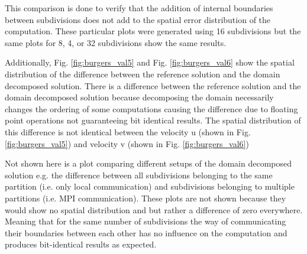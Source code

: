 This comparison is done to verify that the addition of internal boundaries between subdivisions does not add to the spatial error distribution of the computation.
These particular plots were generated using 16 subdivisions but the same plots for 8, 4, or 32 subdivisions show the same results.

Additionally, Fig. \ref{fig:burgers_val5} and Fig. \ref{fig:burgers_val6} show the spatial distribution of the difference between the reference solution and the domain decomposed solution.
There is a difference between the reference solution and the domain decomposed solution because decomposing the domain necessarily changes the ordering of some computations causing the difference due to floating point operations not guaranteeing bit identical results.
The spatial distribution of this difference is not identical between the velocity u (shown in Fig. \ref{fig:burgers_val5}) and velocity v (shown in Fig. \ref{fig:burgers_val6})

Not shown here is a plot comparing different setups of the domain decomposed solution e.g. the difference between all subdivisions belonging to the same partition (i.e. only local communication) and subdivisions belonging to multiple partitions (i.e. MPI communication).
These plots are not shown because they would show no spatial distribution and but rather a difference of zero everywhere.
Meaning that for the same number of subdivisions the way of communicating their boundaries between each other has no influence on the computation and produces bit-identical results as expected.

